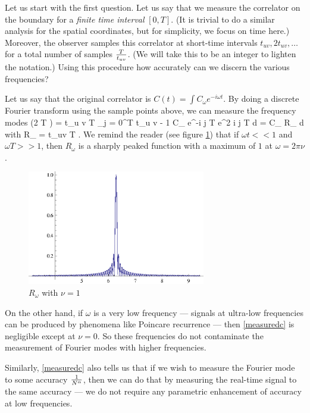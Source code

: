 Let us start with the first question.  Let us say that we  measure the correlator on the boundary for a {\em finite time interval} $[0,T]$. (It is trivial to do a similar analysis for the spatial coordinates, but for simplicity, we focus on time here.) Moreover, the observer samples this correlator at short-time intervals $t_{uv}, 2 t_{u v}, \ldots$ for a total number of samples ${T \over t_{uv}}$. (We will take this to be an integer to lighten the notation.) Using this procedure how accurately  can we discern the various frequencies? 

Let us say that the original correlator is $C(t) = \int C_{\omega} e^{-i \omega t}$. By doing a discrete Fourier transform using the sample points above, we can measure the frequency modes
\be
\label{measuredc}
\left({2 \pi \nu \over T} \right) =  {t_{u v} \over T} \sum_{j = 0}^{{T \over t_{u v}} - 1} \int C_{\omega} e^{-i \omega j \over T} e^{2 \pi i \nu j \over T} d \omega = \int C_{\omega} R_{\omega} d \omega 
\ee
with 
\be
R_{\omega} = {t_{uv} \over T} .
\ee
We remind the reader (see figure \ref{spreadfuncplot}) that if $\omega t << 1$ and $\omega T >> 1$, then $R_{\omega}$ is a sharply peaked function with a maximum of $1$ at $\omega = 2 \pi \nu$.
\begin{figure}
\begin{center}
\includegraphics[height=5cm]{spreadfunc.eps}
\caption{$R_{\omega}$ with $\nu = 1$ \label{spreadfuncplot}}
\end{center}
\end{figure}
 
On the other hand, if $\omega$ is a very low frequency --- signals at ultra-low frequencies can be produced by phenomena like Poincare recurrence --- then \eqref{measuredc} is negligible except at $\nu = 0$. So these frequencies do not contaminate the measurement of Fourier modes with higher frequencies.

Similarly, \eqref{measuredc} also tells us that if we wish to measure
the Fourier mode to some accuracy ${1 \over N^{\alpha}}$, then we can do
that by measuring the real-time signal to the same accuracy --- we do not
require any parametric enhancement of accuracy at low frequencies.

